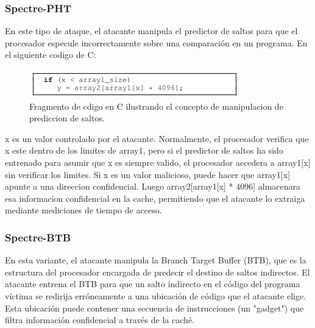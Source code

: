 \documentclass[lettersize,compsoc]{IEEEtran}
\begin{document}
\subsubsection{\textbf{Spectre-PHT}}
En este tipo de ataque, el atacante manipula el predictor de saltos para que el procesador especule incorrectamente sobre una comparación en un programa.
En el siguiente codigo de C:
\begin{figure}[h]
  \centering
  \includegraphics[width=\linewidth]{codigo_c.png}
  \caption{\small Fragmento de cdigo en C ilustrando el concepto de manipulacion de prediccion de saltos.}
  \label{fig:etiqueta}
\end{figure}
\newline x es un valor controlado por el atacante. Normalmente, el procesador verifica que x este dentro de los limites de array1, pero si el predictor de saltos ha sido entrenado para asumir que x es siempre valido, el procesador accedera a array1[x] sin verificar los limites.
Si x es un valor malicioso, puede hacer que array1[x] apunte a una direccion confidencial. Luego array2[array1[x] * 4096] almacenara esa informacion confidencial en la cache, permitiendo que el atacante lo extraiga mediante mediciones de tiempo de acceso. \cite{Spectre}
\subsubsection{\textbf{Spectre-BTB}}
En esta variante, el atacante manipula la Branch Target Buffer (BTB), que es la estructura del procesador encargada de predecir el destino de saltos indirectos.
El atacante entrena el BTB para que un salto indirecto en el código del programa víctima se redirija erróneamente a una ubicación de código que el atacante elige. Esta ubicación puede contener una secuencia de instrucciones (un "gadget") que filtra información confidencial a través de la caché. \cite{Spectre}
\end{document}
